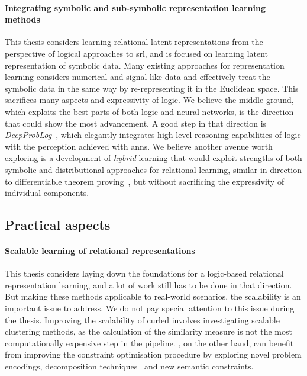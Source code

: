 \paragraph{Integrating symbolic and sub-symbolic representation learning methods}
This thesis considers learning relational latent representations from the perspective of logical approaches to \gls{srl}, and is focused on learning latent representation of symbolic data.
Many existing approaches for representation learning considers numerical and signal-like data and effectively treat the symbolic data in the same way by re-representing it in the Euclidean space.
This sacrifices many aspects and expressivity of logic.
We believe the middle ground, which exploits the best parts of both logic and neural networks, is the direction that could show the most advancement.
A good step in that direction is \textit{DeepProbLog}~\cite{DBLP:journals/corr/abs-1805-10872}, which elegantly integrates high level reasoning capabilities of logic with the perception achieved with \gls{ann}s.
We believe another avenue worth exploring is a development of \textit{hybrid} learning that would exploit strengths of both symbolic and distributional approaches for relational learning, similar in direction to differentiable theorem proving~\cite{DTP2017}, but without sacrificing the expressivity of individual components.






\subsection{Practical aspects}


\paragraph{Scalable learning of relational representations}
This thesis considers laying down the foundations for a logic-based relational representation learning, and a lot of work still has to be done in that direction.
But making these methods applicable to real-world scenarios, the scalability is an important issue to address.
We do not pay special attention to this issue during the thesis.
Improving the scalability of \gls{curled} involves investigating scalable clustering methods, as the calculation of the similarity measure is not the most computationally expensive step in the pipeline.
, on the other hand, can benefit from improving the constraint optimisation procedure by exploring novel problem encodings, decomposition techniques~\cite{decompositions,Friesen:2015:RDN:2832249.2832284}  and new semantic constraints.



